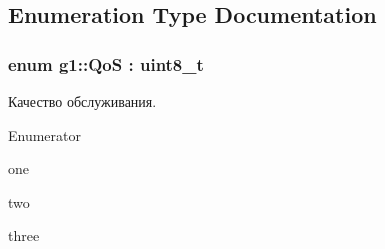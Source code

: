 \subsection{Enumeration Type Documentation}
\subsubsection[{\texorpdfstring{QoS}{QoS}}]{\setlength{\rightskip}{0pt plus 5cm}enum {\bf g1\+::\+QoS} \+: uint8\+\_\+t}\hypertarget{namespaceg1_a157fb77f1b8142697dc1b88efaae6a0a}{}\label{namespaceg1_a157fb77f1b8142697dc1b88efaae6a0a}


Качество обслуживания. 

\begin{Desc}
\item[Enumerator]\par
\begin{description}
\item[{\em 
One\hypertarget{namespaceg1_a157fb77f1b8142697dc1b88efaae6a0aa3a08e2a74d22aa3fcb0ba7207d30814e}{}\label{namespaceg1_a157fb77f1b8142697dc1b88efaae6a0aa3a08e2a74d22aa3fcb0ba7207d30814e}
}]one \item[{\em 
Two\hypertarget{namespaceg1_a157fb77f1b8142697dc1b88efaae6a0aada9a952d5dc002634dc185c74cd9b460}{}\label{namespaceg1_a157fb77f1b8142697dc1b88efaae6a0aada9a952d5dc002634dc185c74cd9b460}
}]two \item[{\em 
Three\hypertarget{namespaceg1_a157fb77f1b8142697dc1b88efaae6a0aa7cb9b75182ee893ea264e4a3097068e7}{}\label{namespaceg1_a157fb77f1b8142697dc1b88efaae6a0aa7cb9b75182ee893ea264e4a3097068e7}
}]three \end{description}
\end{Desc}
